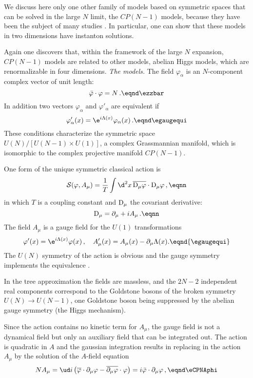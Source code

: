 We discuss here only one other  family of models based on
symmetric spaces that can be solved in the large $N$ limit, the $CP(N-1)$ models,
because they have been the subject of many studies \rCPN.
In particular, one can show that these models in two dimensions
have instanton solutions.
\par
Again one discovers that, within the framework of the large $N$
expansion,   $CP(N-1)$ models are related to  other models, abelian Higgs models, which are renormalizable in four dimensions.
\def\sigmab{\sigma}
\def\varphib{\varphi}
\smallskip
{\it The models.} The field $\varphi_\alpha $ is an $N$-component complex vector of unit length:
$$ \bar \varphi \cdot \varphi=N\,. \eqnd \ezzbar  $$
In addition two vectors $ \varphi_{\alpha} $ and $ \varphi'_{\alpha} $ are
equivalent if
$$ \varphi'_{\alpha} (x)=\e^{i\Lambda(x)}\varphi_{\alpha}(x)\,.
\eqnd\egaugequi $$
These conditions characterize the symmetric space  $U(N)/[U(N-1) \times U(1)] $,
a  complex Grassmannian manifold,
 which is isomorphic to the complex projective manifold  $CP(N-1)$.\par
One form of the unique symmetric classical
action is
$$ {\cal S}(\varphib, A_\mu) ={1 \over T} \int \d^2x\,
\overline{ {\rm D}_{\mu}\varphib}\cdot {\rm D}_{\mu}\varphib\,, \eqnn $$
in which $T$ is a coupling constant and $ {\rm D}_{\mu}$   the covariant derivative:
$$ {\rm D}_{\mu}=\partial_{\mu}+i A_\mu\,. \eqnn $$
The field $A_\mu$ is a gauge field for the $U(1)$ transformations
$$ \varphib'(x)=\e^{i\Lambda(x)}\varphib (x)\,, \quad A'_\mu(x)=A_\mu(x)-\partial _\mu \Lambda (x).\eqnd{\egaugequi} $$
The $U(N)$ symmetry of the action is obvious  and the gauge symmetry
implements the equivalence  \egaugequi. \par
In the tree approximation the fields are massless, and the $2N-2$ independent
real components correspond to the Goldstone bosons of the broken symmetry
$U(N)\to U(N-1)$, one Goldstone boson being suppressed by the abelian
gauge symmetry (the Higgs mechanism).\par
Since the action contains no kinetic term for   $A_\mu$, the gauge field
is not a dynamical field but only an auxiliary field
that can be integrated out. The action is quadratic in $A$ and the gaussian  integration  results in  replacing in the action $A_\mu$ by the solution of the $A $-field equation
$$NA_\mu=\ud i\left(\overline{  \varphi}\cdot \partial_\mu  \varphi-
\overline{\partial_\mu  \varphi}\cdot \varphi \right) =i\bar
\varphib \cdot \partial_{\mu}\varphib\,,\eqnd\eCPNAphi $$
